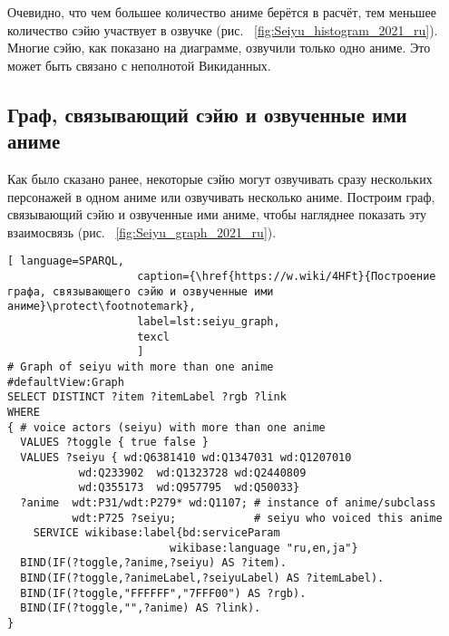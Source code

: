 Очевидно, что чем большее количество аниме берётся в расчёт, тем меньшее количество сэйю участвует в озвучке (рис. ~\ref{fig:Seiyu_histogram_2021_ru}). Многие сэйю, как показано на диаграмме, озвучили только одно аниме. Это может быть связано с неполнотой Викиданных.

\begin{figure*}[h]

    \setlength{\fboxsep}{0pt}%
    \setlength{\fboxrule}{1pt}%
	\caption[Гистограмма, которая показывает число аниме, озвученных различными сэйю, 2021.]{Гистограмма, которая показывает число аниме, озвученных различными сэйю, 2021. Гистограмма построена на основе данных, полученных с помощью запроса~\protect\ref{lst:seiyu_titles_hist}.}%
    \label{fig:Seiyu_histogram_2021_ru}%
\end{figure*} 

\subsection{Граф, связывающий сэйю и озвученные ими аниме}

Как было сказано ранее, некоторые сэйю могут озвучивать сразу нескольких персонажей в одном аниме или озвучивать несколько аниме. Построим граф, связывающий сэйю и озвученные ими аниме, чтобы нагляднее показать эту взаимосвязь (рис. ~\ref{fig:Seiyu_graph_2021_ru}). 

\begin{lstlisting}[ language=SPARQL, 
                    caption={\href{https://w.wiki/4HFt}{Построение графа, связывающего сэйю и озвученные ими аниме}\protect\footnotemark},
                    label=lst:seiyu_graph,
                    texcl 
                    ]
# Graph of seiyu with more than one anime
#defaultView:Graph
SELECT DISTINCT ?item ?itemLabel ?rgb ?link
WHERE
{ # voice actors (seiyu) with more than one anime
  VALUES ?toggle { true false }
  VALUES ?seiyu { wd:Q6381410 wd:Q1347031 wd:Q1207010 
           wd:Q233902  wd:Q1323728 wd:Q2440809 
           wd:Q355173  wd:Q957795  wd:Q50033}
  ?anime  wdt:P31/wdt:P279* wd:Q1107; # instance of anime/subclass
          wdt:P725 ?seiyu;            # seiyu who voiced this anime 
    SERVICE wikibase:label{bd:serviceParam
					     wikibase:language "ru,en,ja"}
  BIND(IF(?toggle,?anime,?seiyu) AS ?item).
  BIND(IF(?toggle,?animeLabel,?seiyuLabel) AS ?itemLabel).
  BIND(IF(?toggle,"FFFFFF","7FFF00") AS ?rgb).
  BIND(IF(?toggle,"",?anime) AS ?link).
}
\end{lstlisting}%

